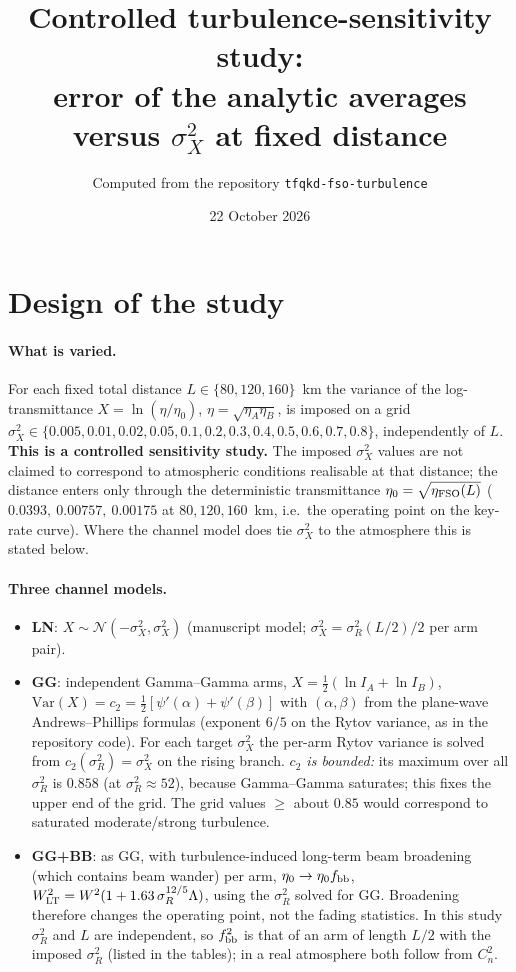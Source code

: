 \documentclass[11pt,a4paper]{article}
\title{Controlled turbulence-sensitivity study:\\ error of the analytic averages versus $\sigma_X^2$ at fixed distance}
\author{Computed from the repository \texttt{tfqkd-fso-turbulence}}
\date{22 October 2026}
\begin{document}
\maketitle

\section{Design of the study}
\paragraph{What is varied.} For each fixed total distance $L\in\{80,120,160\}$~km the variance of the log-transmittance $X=\ln(\eta/\eta_0)$, $\eta=\sqrt{\eta_A\eta_B}$, is imposed on a grid $\sigma_X^2\in\{0.005,0.01,0.02,0.05,0.1,0.2,0.3,0.4,0.5,0.6,0.7,0.8\}$, independently of $L$. \textbf{This is a controlled sensitivity study.} The imposed $\sigma_X^2$ values are not claimed to correspond to atmospheric conditions realisable at that distance; the distance enters only through the deterministic transmittance $\eta_0=\sqrt{\eta_{\rm FSO}(L)}$ ($0.0393,\ 0.00757,\ 0.00175$ at $80,120,160$~km, i.e.\ the operating point on the key-rate curve). Where the channel model does tie $\sigma_X^2$ to the atmosphere this is stated below.

\paragraph{Three channel models.}
\begin{itemize}
\item \textbf{LN}: $X\sim\mathcal N(-\sigma_X^2,\sigma_X^2)$ (manuscript model; $\sigma_X^2=\sigma_R^2(L/2)/2$ per arm pair).
\item \textbf{GG}: independent Gamma--Gamma arms, $X=\tfrac12(\ln I_A+\ln I_B)$, $\mathrm{Var}(X)=c_2=\tfrac12[\psi'(\alpha)+\psi'(\beta)]$ with $(\alpha,\beta)$ from the plane-wave Andrews--Phillips formulas (exponent $6/5$ on the Rytov variance, as in the repository code). For each target $\sigma_X^2$ the per-arm Rytov variance is solved from $c_2(\sigma_R^2)=\sigma_X^2$ on the rising branch. \emph{$c_2$ is bounded:} its maximum over all $\sigma_R^2$ is $0.858$ (at $\sigma_R^2\approx52$), because Gamma--Gamma saturates; this fixes the upper end of the grid. The grid values $\ge$ about $0.85$ would correspond to saturated moderate/strong turbulence.
\item \textbf{GG+BB}: as GG, with turbulence-induced long-term beam broadening (which contains beam wander) per arm, $\eta_0\to\eta_0f_{\rm bb}$, $W_{\rm LT}^2=W^2(1+1.63\,\sigma_R^{12/5}\Lambda)$, using the $\sigma_R^2$ solved for GG. Broadening therefore changes the operating point, not the fading statistics. In this study $\sigma_R^2$ and $L$ are independent, so $f_{\rm bb}^2$ is that of an arm of length $L/2$ with the imposed $\sigma_R^2$ (listed in the tables); in a real atmosphere both follow from $C_n^2$.
\end{itemize}
\end{document}
